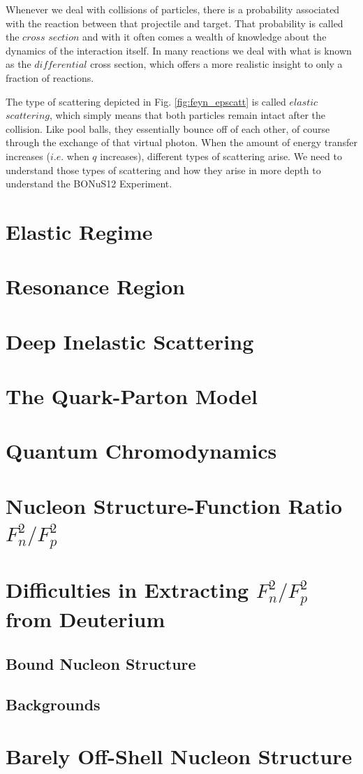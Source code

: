 Whenever we deal with collisions of particles, there is a probability associated with the reaction between that projectile and target. That probability is called the $cross$ $section$ and with it often comes a wealth of knowledge about the dynamics of the interaction itself. In many reactions we deal with what is known as the $differential$ cross section, which offers a more realistic insight to only a fraction of reactions. 

The type of scattering depicted in Fig. \ref{fig:feyn_epscatt} is called $elastic$ $scattering$, which simply means that both particles remain intact after the collision. Like pool balls, they essentially bounce off of each other, of course through the exchange of that virtual photon. When the amount of energy transfer increases ($i.e.$ when $q$ increases), different types of scattering arise. We need to understand those types of scattering and how they arise in more depth to understand the BONuS12 Experiment.

\section{Elastic Regime}


\section{Resonance Region}
\section{Deep Inelastic Scattering}

\section{The Quark-Parton Model}
\section{Quantum Chromodynamics}
\section{Nucleon Structure-Function Ratio $F^2_n/F^2_p$}
\section{Difficulties in Extracting $F^2_n/F^2_p$ from Deuterium}
\subsection{Bound Nucleon Structure}
\subsection{Backgrounds}
\section{Barely Off-Shell Nucleon Structure}
